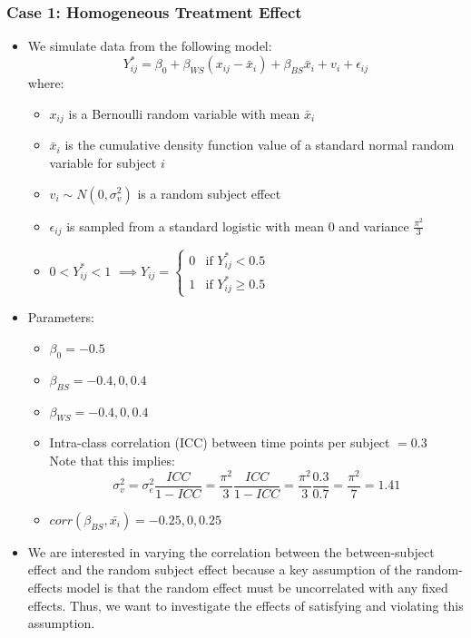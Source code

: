 \documentclass{article}
\begin{document}
        \subsubsection{Case 1: Homogeneous Treatment Effect}
            \begin{itemize}
                \item We simulate data from the following model: $$Y_{ij}^* = \beta_0 + \beta_{WS}(x_{ij}-\bar{x}_i) + \beta_{BS}\bar{x}_i + v_i + \epsilon_{ij}$$
                    where:
                    \begin{itemize}
                        \item $x_{ij}$ is a Bernoulli random variable with mean $\bar{x}_i$
                        \item $\bar{x}_i$ is the cumulative density function value of a standard normal random variable for subject $i$
                        \item $v_i \sim  N(0, \sigma^2_v)$ is a random subject effect
                        \item $\epsilon_{ij}$ is sampled from a standard logistic with mean 0 and variance $\frac{\pi^2}{3}$
                        \item $ 0 < Y_{ij}^* < 1$   $\implies Y_{ij} = 
                            \begin{cases}
                                0 & \text{if } Y_{ij }^* < 0.5\\    
                                1 & \text{if } Y_{ij }^* \ge 0.5    
                            \end{cases}$
                    \end{itemize}
                \item Parameters:
                    \begin{itemize}
                        \item $\beta_0 = -0.5$
                        \item $\beta_{BS} = -0.4, 0, 0.4$
                        \item $\beta_{WS} = -0.4, 0, 0.4$
                        \item Intra-class correlation (ICC) between time points per subject $= 0.3$ \\
                            Note that this implies: $$\sigma^2_v = \sigma^2_e \frac{ICC}{1-ICC} = \frac{\pi^2}{3}\frac{ICC}{1-ICC} = \frac{\pi^2}{3}\frac{0.3}{0.7} = \frac{\pi^2}{7} = 1.41$$
                        \item $corr(\beta_{BS}, \bar{x_i}) = -0.25, 0, 0.25$    
                    \end{itemize}
                \item We are interested in varying the correlation between the between-subject effect and the random subject effect because a key assumption of the random-effects model is that the random effect must be uncorrelated with any fixed effects. Thus, we want to investigate the effects of satisfying and violating this assumption. 
            

\end{itemize}
\end{document}
